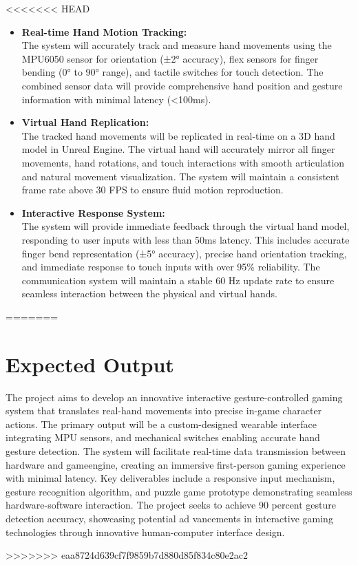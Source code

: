 <<<<<<< HEAD


\begin{itemize}
    \item \textbf{Real-time Hand Motion Tracking:} \\
    The system will accurately track and measure hand movements using the MPU6050 sensor for orientation (±2° accuracy), flex sensors for finger bending (0° to 90° range), and tactile switches for touch detection. The combined sensor data will provide comprehensive hand position and gesture information with minimal latency (<100ms).

    \item \textbf{Virtual Hand Replication:} \\
    The tracked hand movements will be replicated in real-time on a 3D hand model in Unreal Engine. The virtual hand will accurately mirror all finger movements, hand rotations, and touch interactions with smooth articulation and natural movement visualization. The system will maintain a consistent frame rate above 30 FPS to ensure fluid motion reproduction.

    \item \textbf{Interactive Response System:} \\
    The system will provide immediate feedback through the virtual hand model, responding to user inputs with less than 50ms latency. This includes accurate finger bend representation (±5° accuracy), precise hand orientation tracking, and immediate response to touch inputs with over 95\% reliability. The communication system will maintain a stable 60 Hz update rate to ensure seamless interaction between the physical and virtual hands.
\end{itemize}
=======
\section{Expected Output}

 The project aims to develop an innovative interactive gesture-controlled gaming system that
 translates real-hand movements into precise in-game character actions. The primary output will
 be a custom-designed wearable interface integrating MPU sensors, and mechanical switches
 enabling accurate hand gesture detection. The system will facilitate real-time data transmission
 between hardware and gameengine, creating an immersive first-person gaming experience with
 minimal latency. Key deliverables include a responsive input mechanism, gesture recognition
 algorithm, and puzzle game prototype demonstrating seamless hardware-software interaction.
 The project seeks to achieve 90 percent gesture detection accuracy, showcasing potential ad
vancements in interactive gaming technologies through innovative human-computer interface
 design.
 
>>>>>>> eaa8724d639cf7f9859b7d880d85f834c80e2ac2
